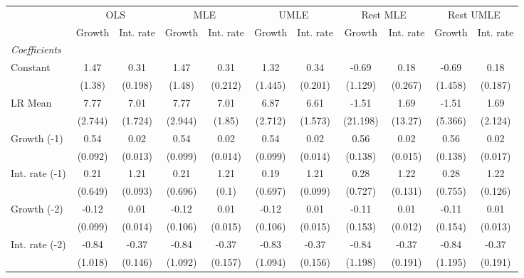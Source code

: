 \begin{table}[htbp] 
	\centering
	\begin{tabular}{@{\extracolsep{4pt}}lcccccccccc@{}}		\hline\hline
		 		 & \multicolumn{2}{c}{OLS} &\multicolumn{2}{c}{MLE} &\multicolumn{2}{c}{UMLE} &\multicolumn{2}{c}{Rest MLE} &\multicolumn{2}{c}{Rest UMLE} \\ 
 		 & Growth 	 & Int. rate 	 & Growth 	 & Int. rate 	 & Growth 	 & Int. rate 	 & Growth 	 & Int. rate 	 & Growth 	 & Int. rate\\\cline{2-3}\cline{4-5}\cline{6-7}\cline{8-9}\cline{10-11}
\rule{0pt}{4ex} 
 \emph{Coefficients} 	  		 & 		 & 		 & 		 & 		 & 		 & 		 & 		 & 		 & 		 &\\ 
\quad Constant 	 & 1.47 	 & 0.31 	 & 1.47 	 & 0.31 	 & 1.32 	 & 0.34 	 & -0.69 	 & 0.18 	 & -0.69 	 & 0.18	 \\ 
 		 & (1.38) 	 & (0.198) 	 & (1.48) 	 & (0.212) 	 & (1.445) 	 & (0.201) 	 & (1.129) 	 & (0.267) 	 & (1.458) 	 & (0.187) 	 \\ 
\quad LR Mean 	 & 7.77 	 & 7.01 	 & 7.77 	 & 7.01 	 & 6.87 	 & 6.61 	 & -1.51 	 & 1.69 	 & -1.51 	 & 1.69	 \\ 
 		 & (2.744) 	 & (1.724) 	 & (2.944) 	 & (1.85) 	 & (2.712) 	 & (1.573) 	 & (21.198) 	 & (13.27) 	 & (5.366) 	 & (2.124) 	 \\ 
\quad Growth (-1) 	 &0.54 	 & 0.02 	 & 0.54 	 & 0.02 	 & 0.54 	 & 0.02 	 & 0.56 	 & 0.02 	 & 0.56 	 & 0.02	 \\ 
 		 & (0.092) 	 & (0.013) 	 & (0.099) 	 & (0.014) 	 & (0.099) 	 & (0.014) 	 & (0.138) 	 & (0.015) 	 & (0.138) 	 & (0.017) 	 \\ 
\quad Int. rate (-1) 	 &0.21 	 & 1.21 	 & 0.21 	 & 1.21 	 & 0.19 	 & 1.21 	 & 0.28 	 & 1.22 	 & 0.28 	 & 1.22	 \\ 
 		 & (0.649) 	 & (0.093) 	 & (0.696) 	 & (0.1) 	 & (0.697) 	 & (0.099) 	 & (0.727) 	 & (0.131) 	 & (0.755) 	 & (0.126) 	 \\ 
\quad Growth (-2) 	 &-0.12 	 & 0.01 	 & -0.12 	 & 0.01 	 & -0.12 	 & 0.01 	 & -0.11 	 & 0.01 	 & -0.11 	 & 0.01	 \\ 
 		 & (0.099) 	 & (0.014) 	 & (0.106) 	 & (0.015) 	 & (0.106) 	 & (0.015) 	 & (0.153) 	 & (0.012) 	 & (0.154) 	 & (0.013) 	 \\ 
\quad Int. rate (-2) 	 &-0.84 	 & -0.37 	 & -0.84 	 & -0.37 	 & -0.83 	 & -0.37 	 & -0.84 	 & -0.37 	 & -0.84 	 & -0.37	 \\ 
 		 & (1.018) 	 & (0.146) 	 & (1.092) 	 & (0.157) 	 & (1.094) 	 & (0.156) 	 & (1.198) 	 & (0.191) 	 & (1.195) 	 & (0.191) 	 \\ 

\end{tabular}
\end{table}
